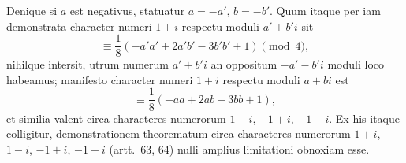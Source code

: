 \documentclass[12pt]{article}
\begin{document}
Denique si $a$ est negativus, statuatur $a=-a'$, $b=-b'$. Quum itaque per iam demonstrata character numeri $1+i$ respectu moduli $a'+b'i$ sit
\[
\equiv \frac18(-a'a'+2a'b'-3b'b'+1)\pmod4,
\]
nihilque intersit, utrum numerum $a'+b'i$ an oppositum $-a'-b'i$ moduli loco habeamus; manifesto character numeri $1+i$ respectu moduli $a+bi$ est
\[
\equiv \frac18(-aa+2ab-3bb+1),
\]
et similia valent circa characteres numerorum $1-i$, $-1+i$, $-1-i$. Ex his itaque colligitur, demonstrationem theorematum circa characteres numerorum $1+i$, $1-i$, $-1+i$, $-1-i$ (artt.~63, 64) nulli amplius limitationi obnoxiam esse.
\end{document}
